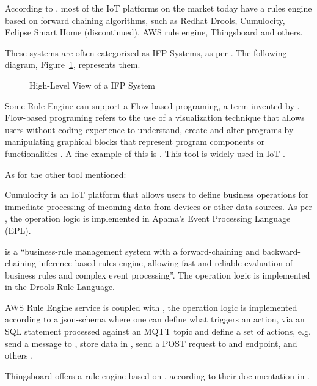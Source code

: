 According to \cite{rules-waylay}, most of the IoT platforms on the market today have a rules engine based on forward chaining algorithms, such as Redhat Drools, Cumulocity, Eclipse Smart Home (discontinued), AWS rule engine, Thingsboard and others.

These systems are often categorized as \gls{IFP} Systems, as per \cite{cugola2012processing}.
The following diagram, Figure~\ref{fig:stateofart:arch:infra:rule:ifp}, represents them.

\begin{figure}[H]
   \centering
  \resizebox{\columnwidth}{!}
  {
     
  }
  \caption[High-Level View of a \gls{IFP} System]{High-Level View of a \gls{IFP} System}
  \label{fig:stateofart:arch:infra:rule:ifp}
\end{figure}

Some Rule Engine can support a Flow-based programing, a term invented by \cite{morrison1994flow}. Flow-based programing refers to the use of a visualization technique that allows users without coding experience to understand, create and alter programs by manipulating graphical blocks that represent program
components or functionalities \cite{morrison2010flow}. A fine example of this is \cite{node-red}. This tool is widely used in \gls{IoT} \parencite{10.1145/3448891.3448938}.

As for the other tool mentioned:

Cumulocity is an \gls{IoT} platform that allows users to define business operations for immediate processing of incoming data from devices or other data sources. As per \cite{cumulocity}, the operation logic is implemented in Apama's Event Processing Language (EPL).

 is a ``business-rule management system with a forward-chaining and backward-chaining inference-based rules engine, allowing fast and reliable evaluation of business rules and complex event processing''. The operation logic is implemented in the Drools Rule Language.

AWS Rule Engine service is coupled with , the operation logic is implemented according to a json-schema where one can define what triggers an action, via an \gls{SQL} statement processed against an \gls{MQTT} topic and define a set of actions, e.g. send a message to , store data in , send a POST request to and endpoint, and others \parencite{aws-rules}.

Thingsboard offers a rule engine based on \cite{node-red}, according to their documentation in .

